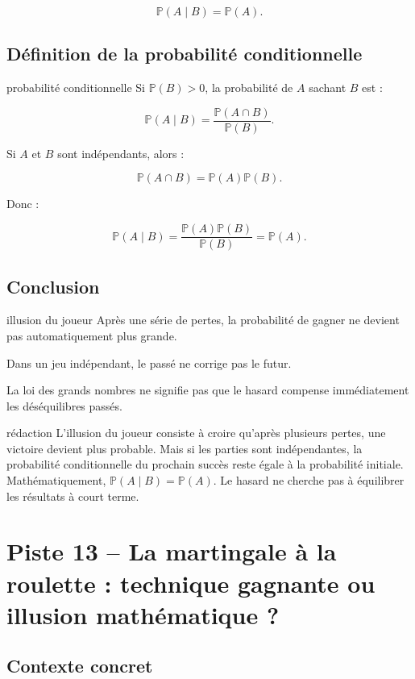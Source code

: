 \documentclass[11pt,a4paper]{article}
\newcommand{\Prob}{\mathbb{P}}
\begin{document}
\[
\Prob(A\mid B)=\Prob(A).
\]

\subsection{Définition de la probabilité conditionnelle}

\begin{definitionbox}{probabilité conditionnelle}
Si $\Prob(B)>0$, la probabilité de $A$ sachant $B$ est :

\[
\Prob(A\mid B)=\frac{\Prob(A\cap B)}{\Prob(B)}.
\]

Si $A$ et $B$ sont indépendants, alors :

\[
\Prob(A\cap B)=\Prob(A)\Prob(B).
\]

Donc :

\[
\Prob(A\mid B)=\frac{\Prob(A)\Prob(B)}{\Prob(B)}=\Prob(A).
\]
\end{definitionbox}

\subsection{Conclusion}

\begin{conclusionbox}{illusion du joueur}
Après une série de pertes, la probabilité de gagner ne devient pas automatiquement plus grande.

Dans un jeu indépendant, le passé ne corrige pas le futur.

La loi des grands nombres ne signifie pas que le hasard compense immédiatement les déséquilibres passés.
\end{conclusionbox}

\begin{oral}{rédaction}
L'illusion du joueur consiste à croire qu'après plusieurs pertes, une victoire devient plus probable. Mais si les parties sont indépendantes, la probabilité conditionnelle du prochain succès reste égale à la probabilité initiale. Mathématiquement, $\Prob(A\mid B)=\Prob(A)$. Le hasard ne cherche pas à équilibrer les résultats à court terme.
\end{oral}
\section{Piste 13 -- La martingale à la roulette : technique gagnante ou illusion mathématique ?}

\subsection{Contexte concret}
\end{document}
